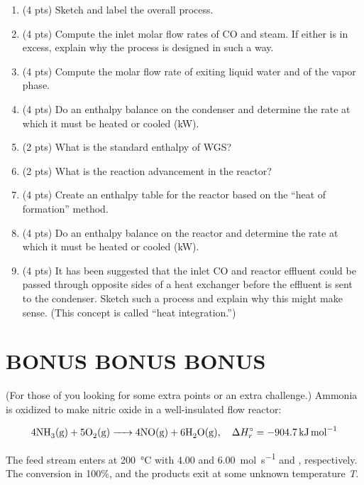 \documentclass[11pt]{article}
\begin{document}
\begin{enumerate}
\item (4 pts) Sketch and label the overall process.
\item (4 pts) Compute the inlet molar flow rates of CO and steam.  If either is in excess, explain why the process is designed in such a way.
\item (4 pts) Compute the molar flow rate of exiting liquid water and of the vapor phase.
\item (4 pts) Do an enthalpy balance on the condenser and determine the rate at which it must be heated or cooled (kW).
\item (2 pts) What is the standard enthalpy of WGS?
\item (2 pts) What is the reaction advancement in the reactor?
\item (4 pts) Create an enthalpy table for the reactor based on the ``heat of formation'' method.
\item (4 pts) Do an enthalpy balance on the reactor and determine the rate at which it must be heated or cooled (kW).
\item (4 pts) It has been suggested that the inlet CO and reactor effluent could be passed through opposite sides of a heat exchanger before the effluent is sent to the condenser. Sketch such a process and explain why this might make sense. (This concept is called ``heat integration.'')
\end{enumerate}

\section{\textbf{BONUS} \textbf{BONUS} \textbf{BONUS}}
\label{sec-5}
(For those of you looking for some extra points or an extra challenge.)  Ammonia is oxidized to make nitric oxide in a well-insulated flow reactor:

\[\ce{4 NH3(g) + 5 O2(g) -> 4 NO(g) + 6 H2O(g)},\quad \Delta H^{\circ}_{r}=\SI{-904.7}{\kilo\joule\per\mole}\]

\noindent The feed stream enters at \SI{200}{\celsius} with 4.00 and \SI{6.00}{\mole\per\second}  and , respectively.  The  conversion in 100\%, and the products exit at some unknown temperature \emph{T}.
\end{document}
